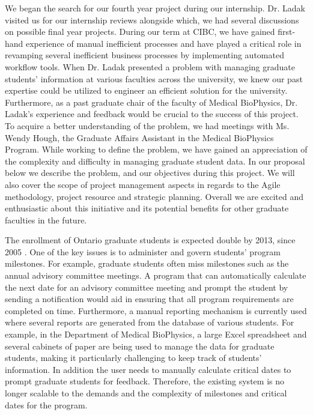 \documentclass{journal}
\begin{document}
We began the search for our fourth year project during our internship. Dr. Ladak visited us for our internship reviews alongside which, we had several discussions on possible final year projects. During our term at CIBC, we have gained first-hand experience of manual inefficient processes and have played a critical role in revamping several inefficient business processes by implementing automated workflow tools. When Dr. Ladak presented a problem with managing graduate students’ information at various faculties across the university, we knew our past expertise could be utilized to engineer an efficient solution for the university. Furthermore, as a past graduate chair of the faculty of Medical BioPhysics, Dr. Ladak's experience and feedback would be crucial to the success of this project. To acquire a better understanding of the problem, we had meetings with Ms. Wendy Hough, the Graduate Affairs Assistant in the Medical BioPhysics Program. While working to define the problem, we have gained an appreciation of the complexity and difficulty in managing graduate student data. In our proposal below we describe the problem, and our objectives during this project. We will also cover the scope of project management aspects in regards to the Agile methodology, project resource and strategic planning. Overall we are excited and enthusiastic about this initiative and its potential benefits for other graduate faculties in the future.

The enrollment of Ontario graduate students is expected double by 2013, since 2005 \cite{con_high}.  One of the key issues is to administer and govern students' program milestones. For example, graduate students often miss milestones such as the annual advisory committee meetings. A program that can automatically calculate the next date for an advisory committee meeting and prompt the student by sending a notification would aid in ensuring that all program requirements are completed on time. Furthermore, a manual reporting mechanism is currently used where several reports are generated from the database of various students.
For example, in the Department of Medical BioPhysics, a large Excel spreadsheet and several cabinets of paper are being used to manage the data for graduate students, making it particularly challenging to keep track of students' information. In addition the user needs to manually calculate critical dates to prompt graduate students for feedback. Therefore, the existing system is no longer scalable to the demands and the complexity of milestones and critical dates for the program. 
\end{document}
